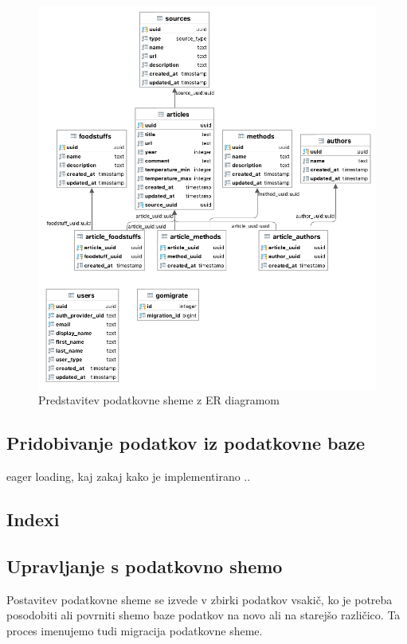 \documentclass[a4paper, 12pt]{book}
\begin{document}
\begin{figure}[h]
\begin{center}
\includegraphics[width=1\textwidth]{slike/database-structure.png}
\end{center}
\caption{ Predstavitev podatkovne sheme z ER diagramom }
\label{database-diagram-er}
\end{figure}
\subsection{Pridobivanje podatkov iz podatkovne baze}
eager loading, kaj zakaj kako je implementirano .. 



\subsection{Indexi }
\subsection{Upravljanje s podatkovno shemo}
Postavitev podatkovne sheme se izvede v zbirki podatkov vsakič, ko je potreba posodobiti ali povrniti shemo baze podatkov na novo ali na starejšo različico. Ta proces imenujemo tudi migracija podatkovne sheme.
\end{document}
